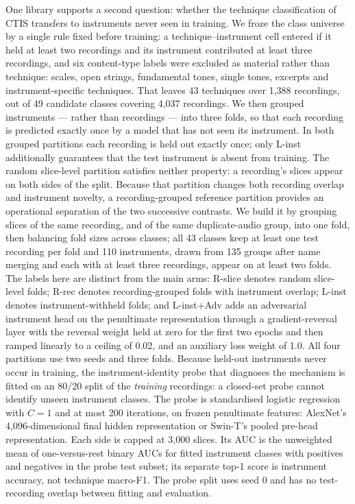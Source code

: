 One library supports a second question: whether the technique classification of CTIS transfers
to instruments never seen in training. We froze the class universe by a single rule fixed before
training: a technique--instrument cell entered if it held at least two recordings and its
instrument contributed at least three recordings, and six content-type labels were excluded as
material rather than technique: scales, open strings, fundamental tones, single tones, excerpts
and instrument-specific techniques. That leaves 43 techniques over 1{,}388 recordings, out of 49
candidate classes covering 4{,}037 recordings. We then grouped instruments --- rather than
recordings --- into three folds, so that each recording is predicted exactly once by a model
that has not seen its instrument. In both grouped partitions each recording is held out
exactly once; only L-inst additionally guarantees that the test instrument is absent from
training. The random slice-level partition satisfies neither property: a recording's slices
appear on both sides of the split. Because that
partition changes both recording overlap and instrument novelty, a recording-grouped reference
partition provides an operational separation of the two successive contrasts. We build it by grouping slices of the same
recording, and of the same duplicate-audio group, into one fold, then balancing fold sizes across
classes; all 43 classes keep at least one test recording per fold and 110 instruments, drawn from 135
groups after name merging and each with at least three recordings, appear on at least two folds. The labels here are distinct from the main arms:
R-slice denotes random slice-level folds; R-rec denotes recording-grouped folds with instrument
overlap; L-inst denotes instrument-withheld folds; and L-inst+Adv adds an adversarial instrument head on the penultimate
representation through a gradient-reversal layer \citep{ganin2014,ganin2015} with the reversal weight held at zero for the first two epochs and then ramped linearly to a
ceiling of 0.02, and an auxiliary loss weight of 1.0. All four partitions use two seeds and three folds. Because held-out instruments never occur in training, the
instrument-identity probe that diagnoses the mechanism is fitted on an 80/20 split of the
\emph{training} recordings: a closed-set probe cannot identify unseen instrument classes.
The probe is standardised logistic regression with $C=1$ and at most 200 iterations, on frozen
penultimate features: AlexNet's 4{,}096-dimensional final hidden representation or Swin-T's
pooled pre-head representation. Each side is capped at 3{,}000 slices. Its AUC is the unweighted
mean of one-versus-rest binary AUCs for fitted instrument classes with positives and negatives
in the probe test subset; its separate top-1 score is instrument accuracy, not technique macro-F1.
The probe split uses seed 0 and has no test-recording overlap between fitting and evaluation.

